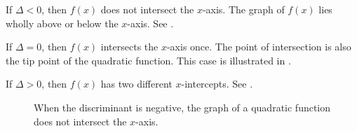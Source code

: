 \documentclass[a4paper,oneside,12pt]{article}
\begin{document}
\begin{packedenumeral}
\item If $\Delta < 0$, then $f(x)$ does not intersect the $x$-axis.
  The graph of $f(x)$ lies wholly above or below the $x$-axis.  See
  .

\item If $\Delta = 0$, then $f(x)$ intersects the $x$-axis once.  The
  point of intersection is also the tip point of the quadratic
  function.  This case is illustrated in
  .

\item If $\Delta > 0$, then $f(x)$ has two different $x$-intercepts.
  See .
\end{packedenumeral}

\begin{figure}[!htbp]
\centering
{}
\quad
\caption{%
  When the discriminant is negative, the graph of a quadratic function
  does not intersect the $x$-axis.
}
\label{fig:negative_discriminant}
\end{figure}
\end{document}
